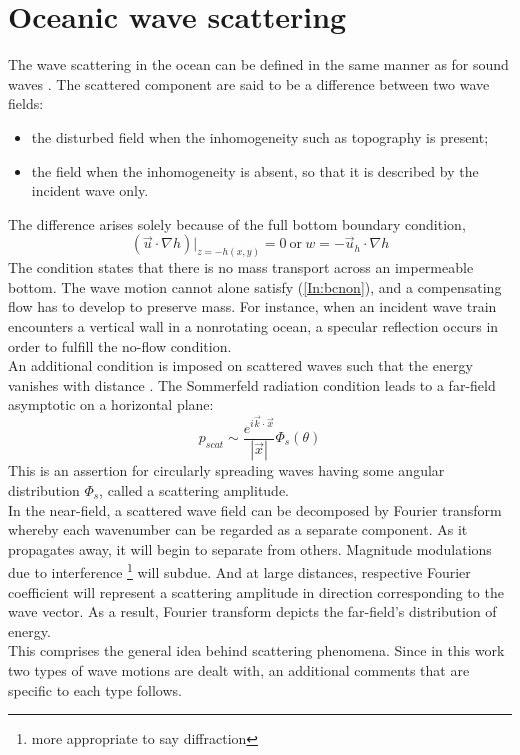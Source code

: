 \documentclass[12pt]{article}
\begin{document}
\section{Oceanic wave scattering}
The wave scattering in the ocean can be defined in the same manner as for sound waves 
\citep{Lighthill2001}. The scattered component are said to be a difference between two wave fields:
\begin{itemize}
	\item the disturbed field when the inhomogeneity such as topography is present;
	\item the field when the inhomogeneity is absent, so that it is described by the incident wave 
	only.
\end{itemize}
The difference arises solely because of the full bottom boundary condition,
\begin{equation}
( \vec{u} \cdot \nabla h )|_{z = -h(x, y)} = 0~\text{or}~w = - \vec{u}_h \cdot \nabla h 
\label{In:bcnon} 
\end{equation}
The condition states that there is no mass transport across an impermeable bottom. The wave motion 
cannot alone satisfy (\ref{In:bcnon}), and a compensating flow has to develop to preserve mass. For 
instance, when an incident wave train encounters a vertical wall in a nonrotating ocean, a 
specular reflection occurs in order to fulfill the no-flow condition.\\
An additional condition is imposed on scattered waves such that the energy vanishes with distance 
\citep{mei1989theory, morse1946methods, olbers1981formal}. The Sommerfeld radiation condition leads 
to a far-field asymptotic on a horizontal plane:
\begin{equation}
\label{In:def.scamp}
p_{scat} \sim \frac{e^{i \vec{k} \cdot \vec{x}}}{|\vec{x}|} \Phi_s (\theta)
\end{equation}
This is an assertion for circularly spreading waves having some angular distribution $\Phi_s$, 
called a scattering amplitude.\\
In the near-field, a scattered wave field can be decomposed by Fourier transform whereby each 
wavenumber can be regarded as a separate component. As it propagates away, it will begin to 
separate from others. Magnitude modulations due to interference \footnote{more appropriate to say 
diffraction} will subdue. And at large distances, respective Fourier coefficient will represent a 
scattering amplitude in direction corresponding to the wave vector. As a result, Fourier transform 
depicts the far-field's distribution of energy.\\
This comprises the general idea behind scattering phenomena. Since in this work two types of 
wave motions are dealt with, an additional comments that are specific to each type follows.
\end{document}
